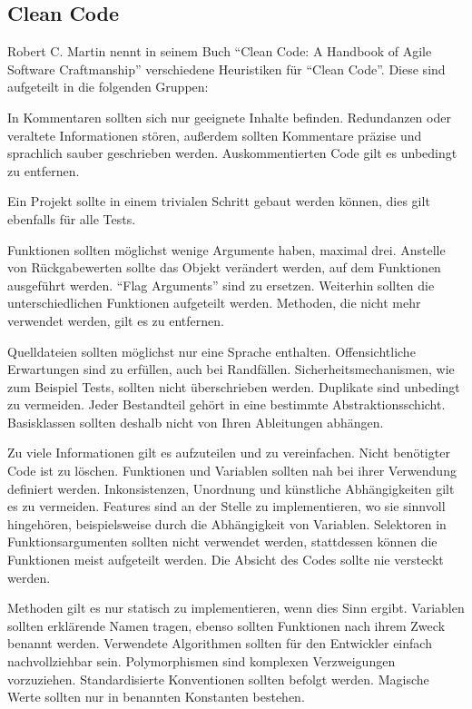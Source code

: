 \newpage

\subsection{Clean Code}
Robert C. Martin nennt in seinem Buch \enquote{Clean Code: A Handbook of Agile Software Craftmanship}\cite{clean-code} verschiedene Heuristiken für \enquote{Clean Code}.
Diese sind aufgeteilt in die folgenden Gruppen:

In Kommentaren sollten sich nur geeignete Inhalte befinden.
Redundanzen oder veraltete Informationen stören, außerdem sollten Kommentare präzise und sprachlich sauber geschrieben werden.
Auskommentierten Code gilt es unbedingt zu entfernen.

Ein Projekt sollte in einem trivialen Schritt gebaut werden können, dies gilt ebenfalls für alle Tests.

Funktionen sollten möglichst wenige Argumente haben, maximal drei.
Anstelle von Rückgabewerten sollte das Objekt verändert werden, auf dem Funktionen ausgeführt werden.
\enquote{Flag Arguments} sind zu ersetzen.
Weiterhin sollten die unterschiedlichen Funktionen aufgeteilt werden.
Methoden, die nicht mehr verwendet werden, gilt es zu entfernen.

Quelldateien sollten möglichst nur eine Sprache enthalten.
Offensichtliche Erwartungen sind zu erfüllen, auch bei Randfällen.
Sicherheitsmechanismen, wie zum Beispiel Tests, sollten nicht überschrieben werden.
Duplikate sind unbedingt zu vermeiden.
Jeder Bestandteil gehört in eine bestimmte Abstraktionsschicht.
Basisklassen sollten deshalb nicht von Ihren Ableitungen abhängen.

Zu viele Informationen gilt es aufzuteilen und zu vereinfachen.
Nicht benötigter Code ist zu löschen.
Funktionen und Variablen sollten nah bei ihrer Verwendung definiert werden.
Inkonsistenzen, Unordnung und künstliche Abhängigkeiten gilt es zu vermeiden.
Features sind an der Stelle zu implementieren, wo sie sinnvoll hingehören, beispielsweise durch die Abhängigkeit von Variablen.
Selektoren in Funktionsargumenten sollten nicht verwendet werden, stattdessen können die Funktionen meist aufgeteilt werden.
Die Absicht des Codes sollte nie versteckt werden.

Methoden gilt es nur statisch zu implementieren, wenn dies Sinn ergibt.
Variablen sollten erklärende Namen tragen, ebenso sollten Funktionen nach ihrem Zweck benannt werden.
Verwendete Algorithmen sollten für den Entwickler einfach nachvollziehbar sein.
Polymorphismen sind komplexen Verzweigungen vorzuziehen.
Standardisierte Konventionen sollten befolgt werden.
Magische Werte sollten nur in benannten Konstanten bestehen.

